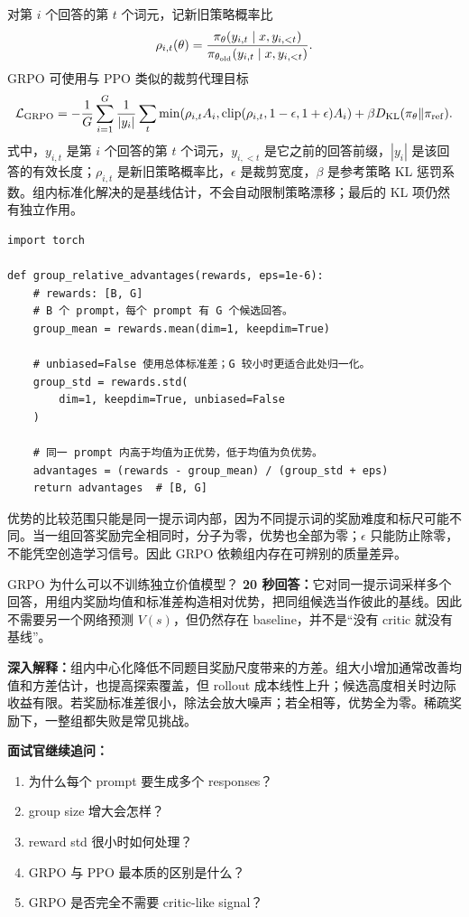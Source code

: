 对第 $i$ 个回答的第 $t$ 个词元，记新旧策略概率比
\[
\rho_{i,t}(\theta)=
\frac{\pi_\theta(y_{i,t}\mid x,y_{i,<t})}
{\pi_{\theta_{\rm old}}(y_{i,t}\mid x,y_{i,<t})}.
\]
GRPO 可使用与 PPO 类似的裁剪代理目标
\[
\mathcal L_{\rm GRPO}
=-\frac{1}{G}\sum_{i=1}^G\frac{1}{|y_i|}\sum_t
\min\!\left(\rho_{i,t}A_i,
\operatorname{clip}(\rho_{i,t},1-\epsilon,1+\epsilon)A_i\right)
+\beta D_{\rm KL}(\pi_\theta\Vert\pi_{\rm ref}).
\]
式中，$y_{i,t}$ 是第 $i$ 个回答的第 $t$ 个词元，$y_{i,<t}$ 是它之前的回答前缀，$|y_i|$ 是该回答的有效长度；$\rho_{i,t}$ 是新旧策略概率比，$\epsilon$ 是裁剪宽度，$\beta$ 是参考策略 KL 惩罚系数。组内标准化解决的是基线估计，不会自动限制策略漂移；最后的 KL 项仍然有独立作用。


\begin{lstlisting}
import torch

def group_relative_advantages(rewards, eps=1e-6):
    # rewards: [B, G]
    # B 个 prompt，每个 prompt 有 G 个候选回答。
    group_mean = rewards.mean(dim=1, keepdim=True)

    # unbiased=False 使用总体标准差；G 较小时更适合此处归一化。
    group_std = rewards.std(
        dim=1, keepdim=True, unbiased=False
    )

    # 同一 prompt 内高于均值为正优势，低于均值为负优势。
    advantages = (rewards - group_mean) / (group_std + eps)
    return advantages  # [B, G]
\end{lstlisting}

优势的比较范围只能是同一提示词内部，因为不同提示词的奖励难度和标尺可能不同。当一组回答奖励完全相同时，分子为零，优势也全部为零；$\epsilon$ 只能防止除零，不能凭空创造学习信号。因此 GRPO 依赖组内存在可辨别的质量差异。

\begin{interviewbox}{GRPO 为什么可以不训练独立价值模型？}
\textbf{20 秒回答：}它对同一提示词采样多个回答，用组内奖励均值和标准差构造相对优势，把同组候选当作彼此的基线。因此不需要另一个网络预测 $V(s)$，但仍然存在 baseline，并不是“没有 critic 就没有基线”。

\textbf{深入解释：}组内中心化降低不同题目奖励尺度带来的方差。组大小增加通常改善均值和方差估计，也提高探索覆盖，但 rollout 成本线性上升；候选高度相关时边际收益有限。若奖励标准差很小，除法会放大噪声；若全相等，优势全为零。稀疏奖励下，一整组都失败是常见挑战。

\textbf{面试官继续追问：}
\begin{enumerate}
  \item 为什么每个 prompt 要生成多个 responses？
  \item group size 增大会怎样？
  \item reward std 很小时如何处理？
  \item GRPO 与 PPO 最本质的区别是什么？
  \item GRPO 是否完全不需要 critic-like signal？
\end{enumerate}
\end{interviewbox}

